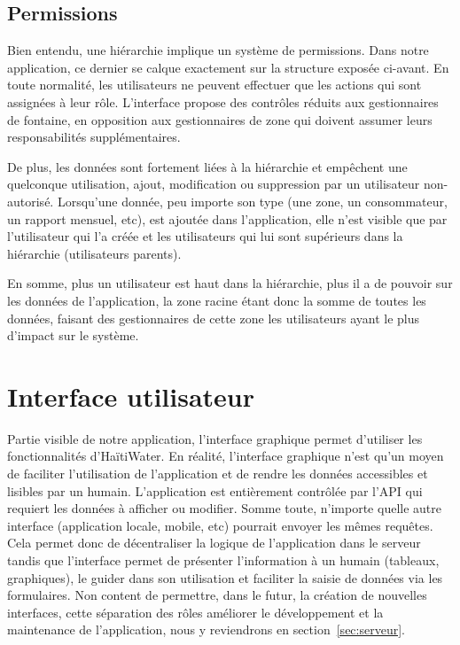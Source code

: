 \documentclass{EPL-master-thesis-covers-FR}
\begin{document}
			\subsection*{Permissions}
				Bien entendu, une hiérarchie implique un système de permissions. Dans notre application, ce dernier se calque exactement sur la structure exposée ci-avant. En toute normalité, les utilisateurs ne peuvent effectuer que les actions qui sont assignées à leur rôle. L'interface propose des contrôles réduits aux gestionnaires de fontaine, en opposition aux gestionnaires de zone qui doivent assumer leurs responsabilités supplémentaires.

				De plus, les données sont fortement liées à la hiérarchie et empêchent une quelconque utilisation, ajout, modification ou suppression par un utilisateur non-autorisé. Lorsqu'une donnée, peu importe son type (une zone, un consommateur, un rapport mensuel, etc), est ajoutée dans l'application, elle n'est visible que par l'utilisateur qui l'a créée et les utilisateurs qui lui sont supérieurs dans la hiérarchie (utilisateurs parents).

				En somme, plus un utilisateur est haut dans la hiérarchie, plus il a de pouvoir sur les données de l'application, la zone racine étant donc la somme de toutes les données, faisant des gestionnaires de cette zone les utilisateurs ayant le plus d'impact sur le système.

		\section{Interface utilisateur}


			Partie visible de notre application, l'interface graphique permet d'utiliser les fonctionnalités d'HaïtiWater. En réalité, l'interface graphique n'est qu'un moyen de faciliter l'utilisation de l'application et de rendre les données accessibles et lisibles par un humain. L'application est entièrement contrôlée par l'API qui requiert les données à afficher ou modifier. Somme toute, n'importe quelle autre interface (application locale, mobile, etc) pourrait envoyer les mêmes requêtes. Cela permet donc de décentraliser la logique de l'application dans le serveur tandis que l'interface permet de présenter l'information à un humain (tableaux, graphiques), le guider dans son utilisation et faciliter la saisie de données via les formulaires. Non content de permettre, dans le futur, la création de nouvelles interfaces, cette séparation des rôles améliorer le développement et la maintenance de l'application, nous y reviendrons en section~\ref{sec:serveur}.
\end{document}
